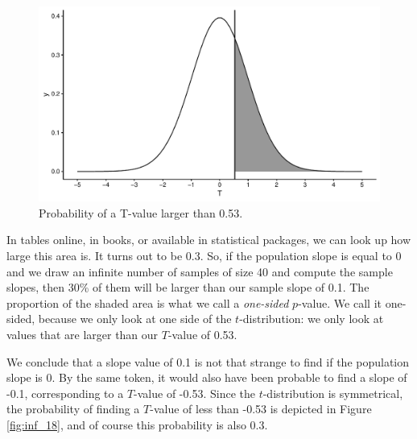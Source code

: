 \documentclass[]{book}\usepackage[]{graphicx}\usepackage[]{color}
\makeatletter
\def\maxwidth{ %
  \ifdim\Gin@nat@width>\linewidth
    \linewidth
  \else
    \Gin@nat@width
  \fi
}
\newenvironment{knitrout}{}{} %
\makeatother
\begin{document}
\begin{knitrout}
\color{fgcolor}\begin{figure}

{\centering \includegraphics[width=\maxwidth]{figure/inf_17-1} 

}

\caption[Probability of a T-value larger than 0.53]{Probability of a T-value larger than 0.53.}\label{fig:inf_17}
\end{figure}


\end{knitrout}

In tables online, in books, or available in statistical packages, we can look up how large this area is. It turns out to be 0.3. So, if the population slope is equal to 0 and we draw an infinite number of samples of size 40 and compute the sample slopes, then 30\% of them will be larger than our sample slope of 0.1. The proportion of the shaded area is what we call a \textit{one-sided} $p$-value. We call it one-sided, because we only look at one side of the $t$-distribution: we only look at values that are larger than our $T$-value of 0.53.

We conclude that a slope value of 0.1 is not that strange to find if the population slope is 0. By the same token, it would also have been probable to find a slope of -0.1, corresponding to a $T$-value of -0.53. Since the $t$-distribution is symmetrical, the probability of finding a $T$-value of less than -0.53 is depicted in Figure \ref{fig:inf_18}, and of course this probability is also 0.3.
\end{document}
